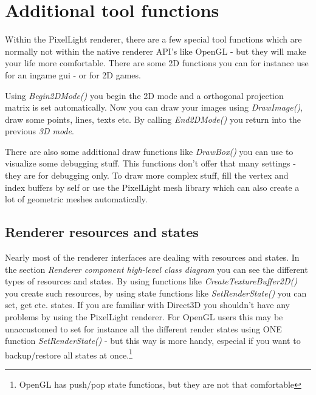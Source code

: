 \section{Additional tool functions}
Within the PixelLight renderer, there are a few special tool functions which are normally not within the native renderer API's like OpenGL - but they will make your life more comfortable. There are some 2D functions you can for instance use for an ingame gui - or for 2D games.

Using \emph{Begin2DMode()} you begin the 2D mode and a orthogonal projection matrix is set automatically. Now you can draw your images using \emph{DrawImage()}, draw some points, lines, texts etc. By calling \emph{End2DMode()} you return into the previous \emph{3D mode}.

There are also some additional draw functions like \emph{DrawBox()} you can use to visualize some debugging stuff. This functions don't offer that many settings - they are for debugging only. To draw more complex stuff, fill the vertex and index buffers by self or use the PixelLight mesh library which can also create a lot of geometric meshes automatically.


\subsection{Renderer resources and states}
Nearly most of the renderer interfaces are dealing with resources and states. In the section \emph{Renderer component high-level class diagram} you can see the different types of resources and states. By using functions like \emph{CreateTextureBuffer2D()} you create such resources, by using state functions like \emph{SetRenderState()} you can set, get etc. states. If you are familiar with Direct3D you shouldn't have any problems by using the PixelLight renderer. For OpenGL users this may be unaccustomed to set for instance all the different render states using ONE function \emph{SetRenderState()} - but this way is more handy, especial if you want to backup/restore all states at once.\footnote{OpenGL has push/pop state functions, but they are not that comfortable}


